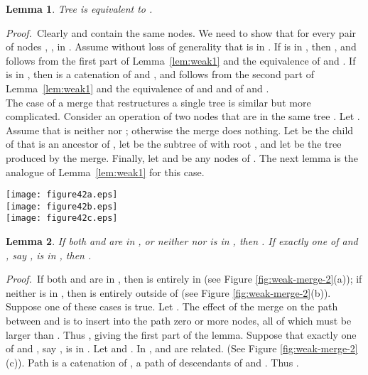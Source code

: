 \documentclass[twoside,leqno,twocolumn]{article}
\newtheorem{lemma}{Lemma}
\newcommand{\proof}{\noindent \emph{Proof.}\ }
\newcommand{\proofend}{\\}
\begin{document}
\begin{lemma}\label{lem:weak2} Tree  is equivalent to .
\end{lemma}
\proof Clearly  and  contain the same nodes.  We need to show that  for every pair of nodes , , in .  Assume without loss of generality that  is in .  If  is in , then , and  follows from the first part of Lemma~\ref{lem:weak1} and the equivalence of  and .  If  is in , then  is a catenation of  and , and  follows from the second part of Lemma~\ref{lem:weak1} and the equivalence of  and  and of  and . \proofend


The case of a merge that restructures a single tree is similar but more complicated.  Consider an operation  of two nodes that are in the same tree .  Let .  Assume that  is neither  nor ; otherwise the merge does nothing.  Let  be the child of  that is an ancestor of , let  be the subtree of  with root , and let  be the tree produced by the merge.  Finally, let  and  be any nodes of .  The next lemma is the analogue of Lemma~\ref{lem:weak1} for this case.

\begin{figure*}\begin{center}
\resizebox{1.\textwidth}{!} {\texttt{[image: figure42a.eps]}}\\
\vspace{.5cm}
\resizebox{1.\textwidth}{!} {\texttt{[image: figure42b.eps]}}\\
\vspace{.5cm}
\resizebox{1.\textwidth}{!} {\texttt{[image: figure42c.eps]}}
\end{center}
\caption{\label{fig:weak-merge-2} Proof of Lemma~\ref{lem:weak3}. Node  is the child of  in  that is an ancestor of .
Nodes in the subtree of  are black and the rest are white. Grey nodes can be either black or white depending on the node labels.
(a) Both  and  are in . After the merge,  is on . (b) Neither is in . Here we assume .  After the merge,  is on . (c) Only  is in ; the situation is similar if only  is in . Here we assume .  After the merge,  is on .}
\end{figure*}

\begin{lemma}\label{lem:weak3} If both  and  are in , or neither  nor  is in , then .  If exactly one of  and , say , is in , then
.
\end{lemma}
\proof If both  and  are in , then  is entirely in  (see Figure \ref{fig:weak-merge-2}(a)); if neither is in , then  is entirely outside of  (see Figure \ref{fig:weak-merge-2}(b)).  Suppose one of these cases is true.  Let .  The effect of the merge on the path between  and  is to insert into the path zero or more nodes, all of which must be larger than .  Thus , giving the first part of the lemma.  Suppose that exactly one of  and , say , is in .  Let  and . In ,  and  are related. (See Figure \ref{fig:weak-merge-2}(c)). Path  is a catenation of , a path of descendants of  and . Thus .\proofend
\end{document}
